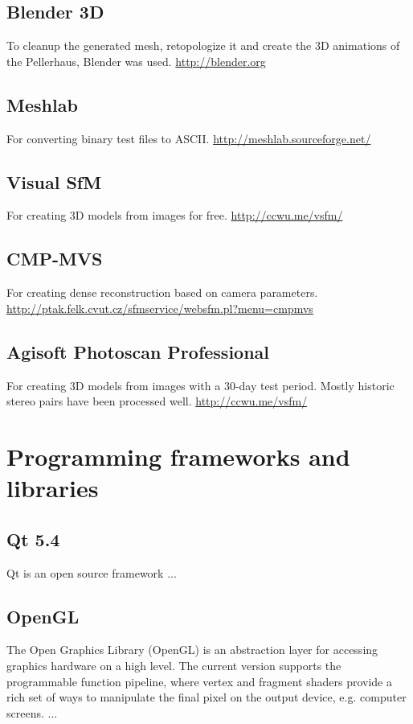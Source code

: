 \subsection{Blender 3D}
To cleanup the generated mesh, retopologize it and create the 3D animations of the Pellerhaus, Blender was used. \url{http://blender.org}

\subsection{Meshlab}
For converting binary test files to ASCII. \url{http://meshlab.sourceforge.net/}

\subsection{Visual SfM}
\label{appendix_visual_sfm}
For creating 3D models from images for free. \url{http://ccwu.me/vsfm/}

\subsection{CMP-MVS}
For creating dense reconstruction based on camera parameters. \url{http://ptak.felk.cvut.cz/sfmservice/websfm.pl?menu=cmpmvs}

\subsection{Agisoft Photoscan Professional}
For creating 3D models from images with a 30-day test period. Mostly historic stereo pairs have been processed well. \url{http://ccwu.me/vsfm/}





\section{Programming frameworks and libraries}

\subsection{Qt 5.4}

Qt is an open source framework ...

\subsection{OpenGL}

The Open Graphics Library (OpenGL) is an abstraction layer for accessing graphics hardware on a high level. The current version supports the programmable function pipeline, where vertex and fragment shaders provide a rich set of ways to manipulate the final pixel on the output device, e.g. computer screens. ...


